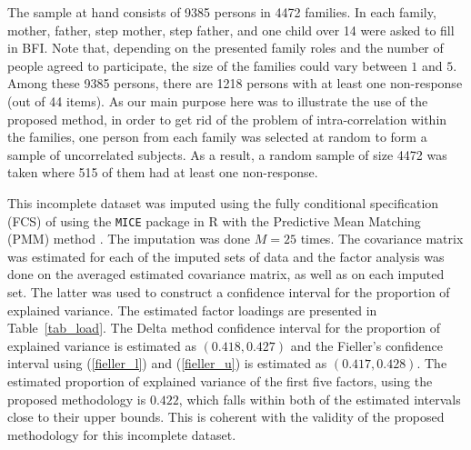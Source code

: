 \documentclass[11pt,a5paper,twoside]{book}
\begin{document}
The sample at hand consists of 9385 persons in 4472 families. In each family, mother, father, step mother, step father, and one child over 14 were asked to fill in BFI. Note that, depending on the presented family roles and the number of people agreed to participate, the size of the families could vary between $1$ and $5$. Among these 9385 persons, there are 1218 persons with at least one non-response (out of 44 items). As our main purpose here was to illustrate the use of the proposed method, in order to get rid of the problem of intra-correlation within the families, one person from each family was selected at random to form a sample of uncorrelated subjects. As a result, a random sample of size 4472 was taken where 515 of them had at least one non-response.

\begin{sloppypar}
This incomplete dataset was imputed using the fully conditional specification (FCS) of \cite{van2007} using the {\tt{MICE}} package in \textsf{R} \citep{buuren2011} with the Predictive Mean Matching (PMM) method \citep*{little1988,vink2014}. The imputation was done $M=25$ times. The covariance matrix was estimated for each of the imputed sets of data and the factor analysis was done on the averaged estimated covariance matrix, as well as on each imputed set. The latter was used to construct a confidence interval for the proportion of explained variance. The estimated factor loadings are presented in Table~\ref{tab_load}. The Delta method confidence interval for the proportion of explained variance is estimated as $(0.418, 0.427)$ and the Fieller's confidence interval using (\ref{fieller_l}) and (\ref{fieller_u}) is estimated as $(0.417, 0.428)$. The estimated proportion of explained variance of the first five factors, using the proposed methodology is $0.422$, which falls within both of the estimated intervals close to their upper bounds. This is coherent with the validity of the proposed methodology for this incomplete dataset.
\end{sloppypar}
\end{document}
